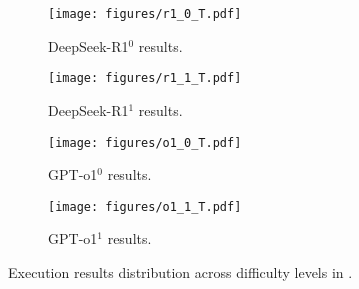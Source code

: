 \begin{figure}[t!]
    \centering
    \begin{subfigure}[t]{0.23\textwidth}
        \centering
        \texttt{[image: figures/r1\_0\_T.pdf]}
        \caption{DeepSeek-R1$^0$ results.}
    \end{subfigure}
    \hspace{-0.008\textwidth}  %
    \begin{subfigure}[t]{0.23\textwidth}
        \centering
        \texttt{[image: figures/r1\_1\_T.pdf]}
        \caption{DeepSeek-R1$^1$ results.}
    \end{subfigure}
    
    \vspace{0.2cm}  %

    \begin{subfigure}[t]{0.23\textwidth}
        \centering
        \texttt{[image: figures/o1\_0\_T.pdf]}
        \caption{GPT-o1$^0$ results.}
    \end{subfigure}
    \hspace{-0.008\textwidth}  %
    \begin{subfigure}[t]{0.23\textwidth}
        \centering
        \texttt{[image: figures/o1\_1\_T.pdf]}
        \caption{GPT-o1$^1$ results.}
    \end{subfigure}

    \caption{Execution results distribution across difficulty levels in \benchtwo.}
    \label{fig:barT}
\end{figure}
